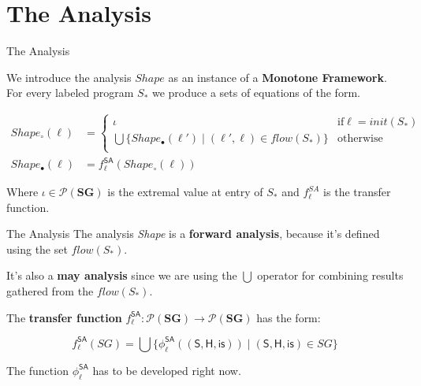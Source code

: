 \documentclass[xcolor=svgnames,11pt]{beamer}
\begin{document}
\section{The Analysis}

\begin{frame}{The Analysis}

We introduce the analysis $Shape$ as an instance of a \textbf{Monotone Framework}. For every labeled program $S_*$ we produce a sets of equations of the form.

\pause

\begin{footnotesize}
\begin{align*}
Shape_{\circ}(\ell) &= \left\{
\begin{array}{ll}
\iota  &\mathrm{if} \ell = init(S_*) \\
\bigcup \{Shape_{\bullet}(\ell') \;|\; (\ell', \ell) \in flow(S_*)\} & \mathrm{otherwise} \\
\end{array}
\right. \\
Shape_{\bullet}(\ell)  &= f_\ell^{\mathsf{SA}}(Shape_{\circ}(\ell)) 
\end{align*}
\end{footnotesize}

\pause

Where $\iota \in \mathcal{P}(\mathbf{SG})$ is the extremal value at entry of $S_*$ and $f_\ell^{SA}$ is the transfer function.

\end{frame}

\begin{frame}{The Analysis}
The analysis \emph{Shape} is a \textbf{forward analysis}, because it's defined using the set $flow(S_*)$.

\medskip
\pause

It's also a \textbf{may analysis} since we are using the $\bigcup$ operator for combining results gathered from the $flow(S_*)$.

\medskip
\pause

The \textbf{transfer function} $f_\ell^{\mathsf{SA}} : \mathcal{P}(\mathbf{SG}) \rightarrow \mathcal{P}(\mathbf{SG})$ has the form:

$$ f_\ell^{\mathsf{SA}}(SG) = \bigcup \{ {\phi}_\ell^{\mathsf{SA}} \mathsf{((S,H,is))} \;|\; \mathsf{(S,H,is)} \in SG \} $$

The function ${\phi}_\ell^{\mathsf{SA}}$ has to be developed right now.
\end{frame}
\end{document}
